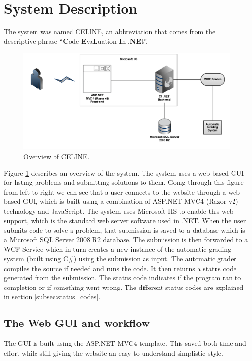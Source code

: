 \section{System Description}
The system was named CELINE, an abbreviation that comes from the descriptive phrase ``\textbf{C}ode \textbf{E}va\textbf{L}uation \textbf{I}n .\textbf{NE}t''.

\begin{figure}[h]
	\centering
	\includegraphics[width=0.9\linewidth]{chapters/media/overview.png}
	\caption{Overview of CELINE.}
	\label{fig:SystemOverview}
\end{figure}

Figure \ref{fig:SystemOverview} describes an overview of the system. The system uses a web based GUI for listing problems and submitting solutions to them. Going through this figure from left to right we can see that a user connects to the website through a web based GUI, which is built using a combination of ASP.NET MVC4 (Razor v2) technology and JavaScript. The system uses Microsoft IIS to enable this web support, which is the standard web server software used in .NET. When the user submits code to solve a problem, that submission is saved to a database which is a Microsoft SQL Server 2008 R2 database. The submission is then forwarded to a WCF Service which in turn creates a new instance of the automatic grading system (built using C\#) using the submission as input. The automatic grader compiles the source if needed and runs the code. It then returns a status code generated from the submission. The status code indicates if the program ran to completion or if something went wrong. The different status codes are explained in section \ref{subsec:status_codes}.


\subsection{The Web GUI and workflow}
The GUI is built using the ASP.NET MVC4 template. This saved both time and effort while still giving the website an easy to understand simplistic style.

